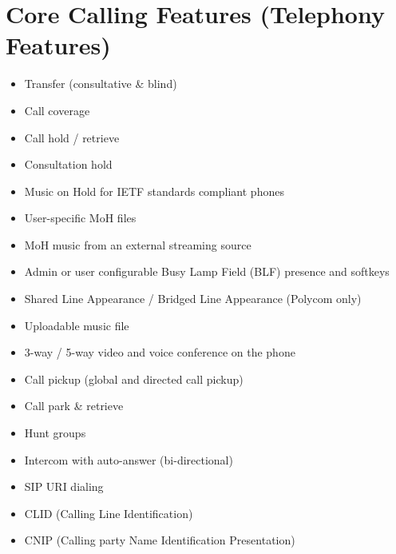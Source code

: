 \documentclass[letterpaper,10pt,english]{sphinxmanual}
\begin{document}
\section{Core Calling Features (Telephony Features)}
\label{\detokenize{features:core-calling-features-telephony-features}}\begin{itemize}
\item {} 
Transfer (consultative \& blind)

\item {} 
Call coverage

\item {} 
Call hold / retrieve

\item {} 
Consultation hold

\item {} 
Music on Hold for IETF standards compliant phones

\item {} 
User-specific MoH files

\item {} 
MoH music from an external streaming source

\item {} 
Admin or user configurable Busy Lamp Field (BLF) presence and softkeys

\item {} 
Shared Line Appearance / Bridged Line Appearance (Polycom only)

\item {} 
Uploadable music file

\item {} 
3-way / 5-way video and voice conference on the phone

\item {} 
Call pickup (global and directed call pickup)

\item {} 
Call park \& retrieve

\item {} 
Hunt groups

\item {} 
Intercom with auto-answer (bi-directional)

\item {} 
SIP URI dialing

\item {} 
CLID (Calling Line Identification)

\item {} 
CNIP (Calling party Name Identification Presentation)


\end{itemize}
\end{document}

